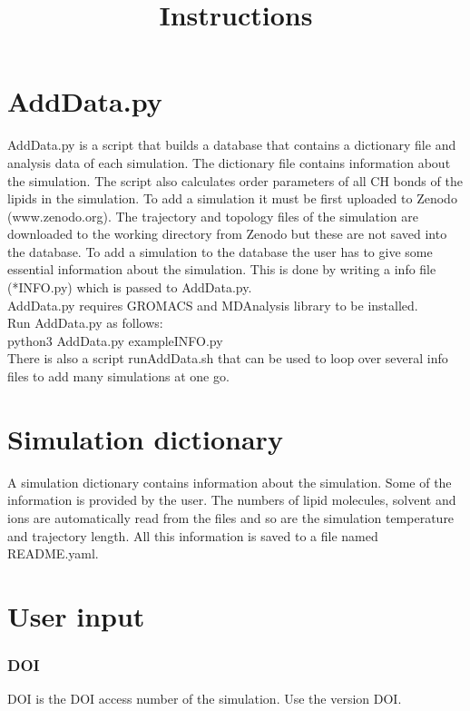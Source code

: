 \documentclass[12pt,a4paper]{article}
\date{}
\title{Instructions}
\begin{document}
\maketitle
\section*{AddData.py}
AddData.py is a script that builds a database that contains a dictionary file and analysis data of each simulation. The dictionary file contains information about the simulation. The script also calculates order parameters of all CH bonds of the lipids in the simulation. To add a simulation it must be first uploaded to Zenodo (www.zenodo.org). The trajectory and topology files of the simulation are downloaded to the working directory from Zenodo but these are not saved into the database. To add a simulation to the database the user has to give some essential information about the simulation. This is done by writing a info file (*INFO.py) which is passed to AddData.py. 
\newline \\
AddData.py requires GROMACS and MDAnalysis library to be installed.
\newline \\
Run AddData.py as follows:
\newline \\
python3 AddData.py exampleINFO.py
\newline \\
There is also a script runAddData.sh that can be used to loop over several info files to add many simulations at one go.



\section*{Simulation dictionary}
A simulation dictionary contains information about the simulation. Some of the information is provided by the user. The numbers of lipid molecules, solvent and ions are automatically read from the files and so are the simulation temperature and trajectory length. All this information is saved to a file named README.yaml.

\section*{User input}

\subsubsection*{DOI}
DOI is the DOI access number of the simulation. Use the version DOI.
\end{document}
